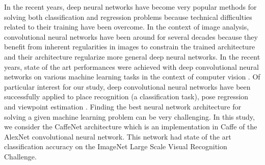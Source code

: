 In the recent years, deep neural networks have become very popular methods for solving both classification and regression problems because technical difficulties related to their training have been overcome. In the context of image analysis, convolutional neural networks have been around for several decades because they benefit from inherent regularities in images to constrain the trained architecture and their architecture regularize more general deep neural networks. In the recent years, state of the art performances were achieved with deep convolutional neural networks on various machine learning tasks in the context of computer vision \cite{NIPS2012_4824,Simonyan14c}. Of particular interest for our study, deep convolutional neural networks have been successfully applied to place recognition \cite{Sunderhauf2015b} (a classification task), pose regression \cite{conf/accv/PfisterSCZ14} and viewpoint estimation \cite{Su2015}. Finding the best neural network architecture for solving a given machine learning problem can be very challenging. In this study, we consider the CaffeNet architecture which is an implementation in Caffe\cite{jia2014caffe} of the AlexNet convolutional neural network\cite{NIPS2012_4824}. This network had state of the art classification accuracy on the ImageNet Large Scale Visual Recognition Challenge.


